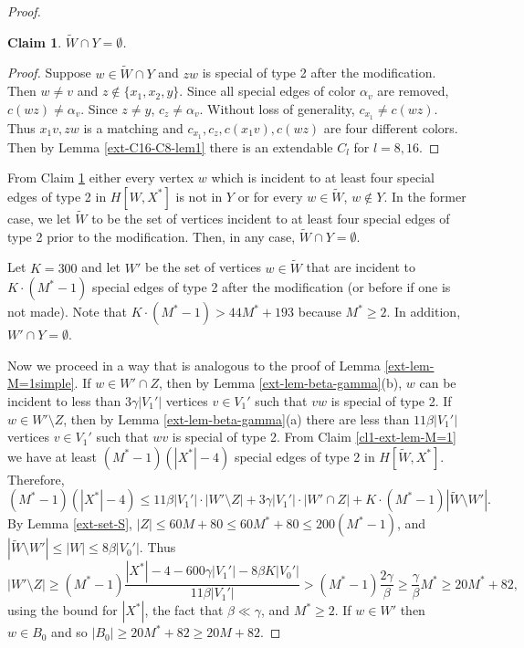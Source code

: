 \documentclass{article}
\newtheorem{claim}[theorem]{Claim}
\begin{document}
\begin{proof}
\begin{claim} \label{cl2-ext-lem-M=1}$\widetilde{W}\cap Y=\emptyset$.
\end{claim}
\begin{proof}
Suppose $w\in \widetilde{W}\cap Y$ and $zw$ is special of type 2 after the modification. Then $w\neq v$ and $z\notin \{x_1,x_2, y\}.$ Since all special edges of color $\alpha_v$ are removed, $c(wz)\neq \alpha_v$.
Since $z\neq y$, $c_z\neq \alpha_v$. Without loss of generality, $c_{x_1}\neq c(wz)$. Thus $x_1v, zw$ is a matching and $c_{x_1},c_z, c(x_1v), c(wz)$ are four different colors. Then by Lemma \ref{ext-C16-C8-lem1} there is an extendable $C_l$ for $l=8, 16$.
\end{proof}
From Claim \ref{cl2-ext-lem-M=1} either every vertex $w$ which is incident to at least four special edges of type 2 in $H[W,X^*]$ is not in $Y$ or for every $w\in \widetilde{W}$, $w\notin Y$. In the former case, we let $\widetilde{W}$ to be the set of vertices incident to at least four special edges of type 2 prior to the modification. Then, in any case, $\widetilde{W}\cap Y=\emptyset.$ 

Let $K=300$ and let $W'$ be the set of vertices $w\in \widetilde{W}$ that are incident to $K\cdot (M^*-1)$ special edges of type 2 after the modification (or before if one is not made). Note that $K\cdot(M^*-1)> 44M^*+193$ because $M^*\geq 2$. In addition, $W'\cap Y=\emptyset$.

Now we proceed in a way that is analogous to the proof of Lemma \ref{ext-lem-M=1simple}. 
If $w\in W'\cap Z$, then by Lemma \ref{ext-lem-beta-gamma}(b), $w$ can be incident to less than $3\gamma |V_1'|$ vertices $v\in V_1'$ such that $vw$ is special of type 2. If $w\in W'\setminus Z$, then by Lemma \ref{ext-lem-beta-gamma}(a)  there are less than $11\beta |V_1'|$ vertices $v\in V_1'$ such that $wv$ is special of type 2. %
From Claim \ref{cl1-ext-lem-M=1} we have at least $(M^*-1)(|X^*|-4)$ special edges of type 2 in $H[\widetilde{W},X^*]$. Therefore,
$$(M^*-1)(|X^*|-4)\leq 11\beta |V_1'|\cdot |W'\setminus Z|+ 3\gamma |V_1'|\cdot|W'\cap Z| +K\cdot(M^*-1)|\widetilde{W}\setminus W'|.$$
By Lemma \ref{ext-set-S}, $|Z|\leq 60M+80\leq 60M^*+80\leq 200(M^*-1)$, and $|\widetilde{W}\setminus W'|\leq |W|\leq  8\beta |V_0'|$. Thus
$$|W'\setminus Z|\geq (M^*-1)\frac{|X^*|-4- 600\gamma |V_1'|-8\beta K|V_0'|}{11\beta |V_1'|}>(M^*-1)\frac{2\gamma}{\beta}\geq \frac{\gamma}{\beta}{M^*}\geq 20 M^* + 82,$$
using the bound for $|X^*|$, the fact that $\beta \ll \gamma$, and $M^*\geq 2$. If $w\in W'$ then $w\in B_{0}$ and so $|B_{0}|\geq 20M^*+82\geq 20 M+82$.
\end{proof}
\end{document}
